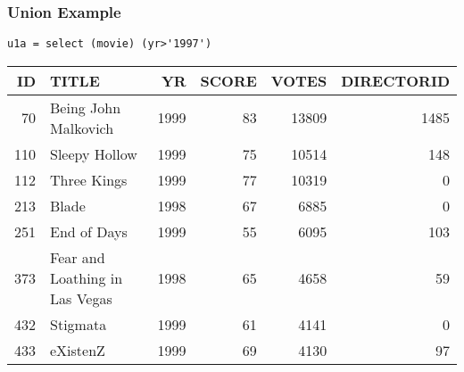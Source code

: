 \documentclass[dvipsnames]{beamer}
\theoremstyle{plain}
\begin{document}
\begin{frame}[fragile]
  \frametitle{Union Example}

  \begin{example}
    \begin{lstlisting}
u1a = select (movie) (yr>'1997')
    \end{lstlisting}

    \pause
    \begin{tiny}
    \begin{table}
      \begin{tabular}{|r|l|r|r|r|r|}\hline
 ID & TITLE                          &   YR & SCORE & VOTES & DIRECTORID\\\hline\hline
 70 & Being John Malkovich           & 1999 &    83 & 13809 &       1485\\\hline
110 & Sleepy Hollow                  & 1999 &    75 & 10514 &        148\\\hline
112 & Three Kings                    & 1999 &    77 & 10319 &          0\\\hline
213 & Blade                          & 1998 &    67 &  6885 &          0\\\hline
251 & End of Days                    & 1999 &    55 &  6095 &        103\\\hline
373 & Fear and Loathing in Las Vegas & 1998 &    65 &  4658 &         59\\\hline
432 & Stigmata                       & 1999 &    61 &  4141 &          0\\\hline
433 & eXistenZ                       & 1999 &    69 &  4130 &         97\\\hline
      \end{tabular}
    \end{table}
    \end{tiny}
  \end{example}
\end{frame}
\end{document}

